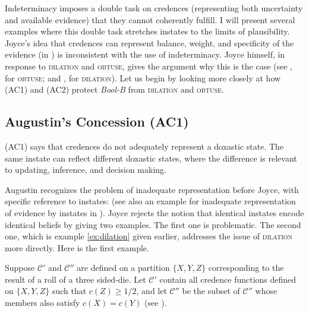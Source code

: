 \documentclass[11pt]{article}
\newcommand{\augustin}[0]{\textit{Bool-B}}
\begin{document}
Indeterminacy imposes a double task on credences (representing both
uncertainty and available evidence) that they cannot coherently
fulfill. I will present several examples where this double task
stretches instates to the limits of plausibility. Joyce's idea that
credences can represent balance, weight, and specificity of the
evidence (in ) is inconsistent with the use of
indeterminacy. Joyce himself, in response to \textsc{dilation} and
\textsc{obtuse}, gives the argument why this is the case (see
, for \textsc{obtuse}; and
, for \textsc{dilation}). Let us
begin by looking more closely at how (AC1) and (AC2) protect
{\augustin} from \textsc{dilation} and \textsc{obtuse}.

\subsection{Augustin's Concession (AC1)}
\label{jj1}

(AC1) says that credences do not adequately represent a doxastic
state. The same instate can reflect different doxastic states, where
the difference is relevant to updating, inference, and decision
making.

Augustin recognizes the problem of inadequate representation before
Joyce, with specific reference to instates:   (see also an example for
inadequate representation of evidence by instates in
). Joyce rejects the notion that
identical instates encode identical beliefs by giving two examples.
The first one is problematic. The second one, which is example
\ref{ex:dilation} given earlier, addresses the issue of
\textsc{dilation} more directly. Here is the first example.

\begin{quotex}
  \label{ex:die} Suppose $\mathcal{C}'$ and
  $\mathcal{C}''$ are defined on a partition $\{X,Y,Z\}$ corresponding
  to the result of a roll of a three sided-die. Let $\mathcal{C}'$
  contain all credence functions defined on $\{X,Y,Z\}$ such that
  $c(Z)\geq1/2$, and let $\mathcal{C}''$ be the subset of
  $\mathcal{C}''$ whose members also satisfy $c(X)=c(Y)$ (see
  ).
\end{quotex}
\end{document}
